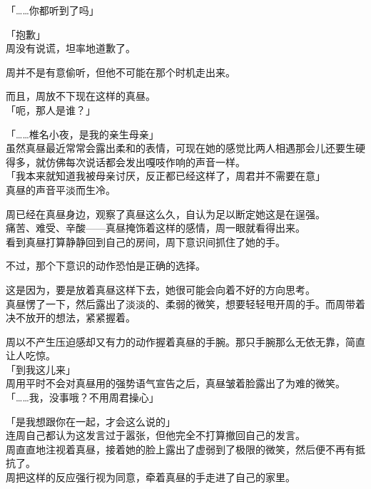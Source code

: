 「……你都听到了吗」

「抱歉」\\

周没有说谎，坦率地道歉了。

周并不是有意偷听，但他不可能在那个时机走出来。

而且，周放不下现在这样的真昼。\\

「呃，那人是谁？」

「……椎名小夜，是我的亲生母亲」\\

虽然真昼最近常常会露出柔和的表情，可现在她的感觉比两人相遇那会儿还要生硬得多，就仿佛每次说话都会发出嘎吱作响的声音一样。\\

「我本来就知道我被母亲讨厌，反正都已经这样了，周君并不需要在意」\\

真昼的声音平淡而生冷。

周已经在真昼身边，观察了真昼这么久，自认为足以断定她这是在逞强。\\

痛苦、难受、辛酸——真昼掩饰着这样的感情，周一眼就看得出来。\\

看到真昼打算静静回到自己的房间，周下意识间抓住了她的手。

不过，那个下意识的动作恐怕是正确的选择。

这是因为，要是放着真昼这样下去，她很可能会向着不好的方向思考。\\

真昼愣了一下，然后露出了淡淡的、柔弱的微笑，想要轻轻甩开周的手。而周带着决不放开的想法，紧紧握着。

周以不产生压迫感却又有力的动作握着真昼的手腕。那只手腕那么无依无靠，简直让人吃惊。\\

「到我这儿来」\\

周用平时不会对真昼用的强势语气宣告之后，真昼皱着脸露出了为难的微笑。\\

「……我，没事哦？不用周君操心」

「是我想跟你在一起，才会这么说的」\\

连周自己都认为这发言过于嚣张，但他完全不打算撤回自己的发言。\\

周直直地注视着真昼，接着她的脸上露出了虚弱到了极限的微笑，然后便不再有抵抗了。\\

周把这样的反应强行视为同意，牵着真昼的手走进了自己的家里。
